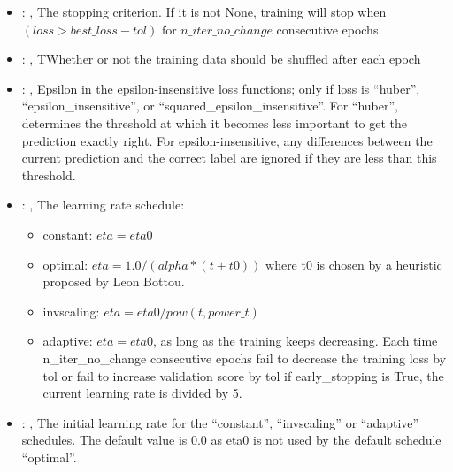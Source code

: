 \begin{itemize}
    \item {}: , 
      The stopping criterion. If it is not None, training will stop when $(loss > best\_loss - tol)$
      for $n\_iter\_no\_change$                                                  consecutive epochs.

    \item {}: , 
      TWhether or not the training data should be shuffled after each epoch

    \item {}: , 
      Epsilon in the epsilon-insensitive loss functions; only if loss is ``huber'',
      ``epsilon\_insensitive'', or
      ``squared\_epsilon\_insensitive''. For ``huber'', determines the threshold at which it becomes
      less important to get the                                                  prediction exactly
      right. For epsilon-insensitive, any differences between the current prediction and the correct
      label                                                  are ignored if they are less than this
      threshold.

    \item {}: , 
      The learning rate schedule:                                                  \begin{itemize}
      \item constant: $eta = eta0$                                                   \item optimal:
      $eta = 1.0 / (alpha * (t + t0))$ where t0 is chosen by a heuristic proposed by Leon Bottou.
      \item invscaling: $eta = eta0 / pow(t, power\_t)$
      \item adaptive: $eta = eta0$, as long as the training keeps decreasing. Each time
      n\_iter\_no\_change consecutive epochs fail
      to decrease the training loss by tol or fail to increase validation score by tol if
      early\_stopping is True, the current
      learning rate is divided by 5.                                                  \end{itemize}

    \item {}: , 
      The initial learning rate for the ``constant'', ``invscaling'' or ``adaptive'' schedules. The
      default value is 0.0                                                  as eta0 is not used by
      the default schedule ``optimal''.


\end{itemize}
